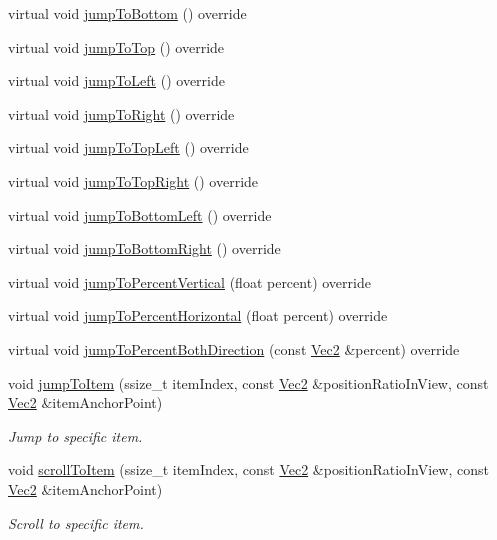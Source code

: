 \begin{DoxyCompactItemize}
virtual void \hyperlink{classui_1_1ListView_a188c4b2a431157ef28ba92c26f1157cc}{jump\+To\+Bottom} () override
\item 
virtual void \hyperlink{classui_1_1ListView_af3477294f3fc87bbc9aaa1bec3c86fd8}{jump\+To\+Top} () override
\item 
virtual void \hyperlink{classui_1_1ListView_a80457edf6517c62347fab9583e6ad063}{jump\+To\+Left} () override
\item 
virtual void \hyperlink{classui_1_1ListView_a07a1265c424478b68dc7d691bd29dc85}{jump\+To\+Right} () override
\item 
virtual void \hyperlink{classui_1_1ListView_a18c1e20a9c26bffa2ff05156673d4ce9}{jump\+To\+Top\+Left} () override
\item 
virtual void \hyperlink{classui_1_1ListView_a9410511689cc348ef305886a44ec0d96}{jump\+To\+Top\+Right} () override
\item 
virtual void \hyperlink{classui_1_1ListView_a298f184bd6a527a03e8a3f28ec20fc6a}{jump\+To\+Bottom\+Left} () override
\item 
virtual void \hyperlink{classui_1_1ListView_ac76553a765cff9931a56c75c75484650}{jump\+To\+Bottom\+Right} () override
\item 
virtual void \hyperlink{classui_1_1ListView_a970383495e57eebfa9306c1876dbcff6}{jump\+To\+Percent\+Vertical} (float percent) override
\item 
virtual void \hyperlink{classui_1_1ListView_a770ffffaa274cc0bd86828910586632d}{jump\+To\+Percent\+Horizontal} (float percent) override
\item 
virtual void \hyperlink{classui_1_1ListView_aeb683b8f4eb94d0f22d78c0652bd331a}{jump\+To\+Percent\+Both\+Direction} (const \hyperlink{classVec2}{Vec2} \&percent) override
\item 
void \hyperlink{classui_1_1ListView_a15d78fe1de4f989add6874266d153804}{jump\+To\+Item} (ssize\+\_\+t item\+Index, const \hyperlink{classVec2}{Vec2} \&position\+Ratio\+In\+View, const \hyperlink{classVec2}{Vec2} \&item\+Anchor\+Point)
\begin{DoxyCompactList}\small\item\em Jump to specific item. \end{DoxyCompactList}\item 
void \hyperlink{classui_1_1ListView_aeb284de1ebb4ae2e30c6c478d6e1d1a0}{scroll\+To\+Item} (ssize\+\_\+t item\+Index, const \hyperlink{classVec2}{Vec2} \&position\+Ratio\+In\+View, const \hyperlink{classVec2}{Vec2} \&item\+Anchor\+Point)
\begin{DoxyCompactList}\small\item\em Scroll to specific item. \end{DoxyCompactList}\item 

\end{DoxyCompactItemize}
